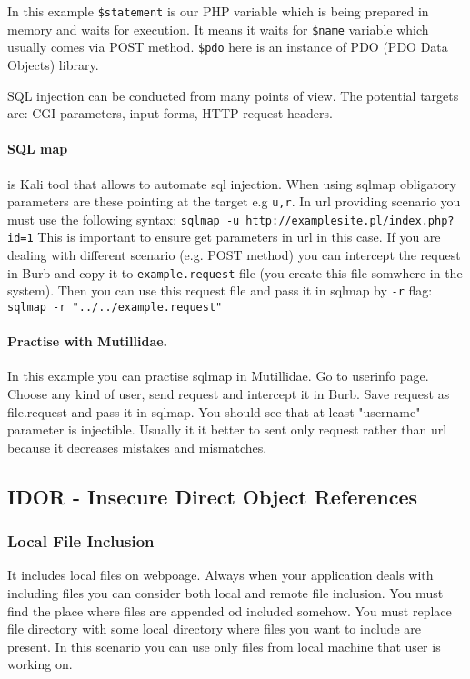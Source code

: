 \documentclass{article}[12pt]
\begin{document}
In this example \texttt{\$statement} is our PHP variable  which is being prepared in memory and waits for execution. It means it waits for \texttt{\$name} variable which usually comes via POST method. \texttt{\$pdo} here is an instance of PDO (PDO Data Objects) library.

SQL injection can be conducted from many points of view. The potential targets are: CGI parameters, input forms, HTTP request headers.


\paragraph{SQL map} is Kali tool that allows to automate sql injection. When using sqlmap obligatory parameters are these pointing at the target e.g \texttt{u,r}. In url providing scenario you must use the following syntax: \texttt{sqlmap -u http://examplesite.pl/index.php?id=1}
\newline
This is important to ensure get parameters in url in this case. If you are dealing with different scenario (e.g. POST method) you can intercept the request in Burb and copy it to \texttt{example.request} file (you create this file somwhere in the system). Then you can use this request file and pass it in sqlmap by \texttt{-r} flag: \newline
\texttt{sqlmap -r "../../example.request"}
\paragraph{Practise with Mutillidae. }
In this example you can practise sqlmap in Mutillidae. Go to userinfo page. Choose  any kind of user, send request and intercept it in Burb. Save request as file.request and pass it in sqlmap. You should see that at least "username" parameter is injectible.
Usually it it better to sent only request rather than url because it decreases mistakes and mismatches.


\subsection{IDOR - Insecure Direct Object References}
\subsubsection{Local File Inclusion} It includes local files on webpoage. Always when your application deals with including files you can consider both local and remote file inclusion. You must find the place where files are appended od included somehow. You must replace file directory with some local directory where files you want to include are present. In this scenario you can use only files from local machine that user is working on.
\end{document}
